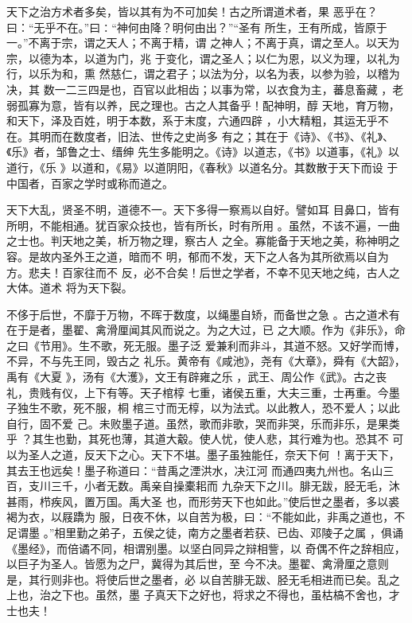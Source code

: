 \documentclass[a4paper,12pt,UTF8,twoside]{ctexbook}
\begin{document}
天下之治方术者多矣，皆以其有为不可加矣！古之所谓道术者，果 恶乎在？曰：“无乎不在。”曰∶“神何由降？明何由出？”“圣有 所生，王有所成，皆原于一。”不离于宗，谓之天人；不离于精，谓 之神人；不离于真，谓之至人。以天为宗，以德为本，以道为门，兆 于变化，谓之圣人；以仁为恩，以义为理，以礼为行，以乐为和，熏 然慈仁，谓之君子；以法为分，以名为表，以参为验，以稽为决，其 数一二三四是也，百官以此相齿；以事为常，以衣食为主，蕃息畜藏 ，老弱孤寡为意，皆有以养，民之理也。古之人其备乎！配神明，醇 天地，育万物，和天下，泽及百姓，明于本数，系于末度，六通四辟 ，小大精粗，其运无乎不在。其明而在数度者，旧法、世传之史尚多 有之；其在于《诗》、《书》、《礼》、《乐》者，邹鲁之士、缙绅 先生多能明之。《诗》以道志，《书》以道事，《礼》以道行，《乐 》以道和，《易》以道阴阳，《春秋》以道名分。其数散于天下而设 于中国者，百家之学时或称而道之。

天下大乱，贤圣不明，道德不一。天下多得一察焉以自好。譬如耳 目鼻口，皆有所明，不能相通。犹百家众技也，皆有所长，时有所用 。虽然，不该不遍，一曲之士也。判天地之美，析万物之理，察古人 之全。寡能备于天地之美，称神明之容。是故内圣外王之道，暗而不 明，郁而不发，天下之人各为其所欲焉以自为方。悲夫！百家往而不 反，必不合矣！后世之学者，不幸不见天地之纯，古人之大体。道术 将为天下裂。

不侈于后世，不靡于万物，不晖于数度，以绳墨自矫，而备世之急 。古之道术有在于是者，墨翟、禽滑厘闻其风而说之。为之大过，已 之大顺。作为《非乐》，命之曰《节用》。生不歌，死无服。墨子泛 爱兼利而非斗，其道不怒。又好学而博，不异，不与先王同，毁古之 礼乐。黄帝有《咸池》，尧有《大章》，舜有《大韶》，禹有《大夏 》，汤有《大濩》，文王有辟雍之乐 ，武王、周公作《武》。古之丧礼，贵贱有仪，上下有等。天子棺椁 七重，诸侯五重，大夫三重，士再重。今墨子独生不歌，死不服，桐 棺三寸而无椁，以为法式。以此教人，恐不爱人；以此自行，固不爱 己。未败墨子道。虽然，歌而非歌，哭而非哭，乐而非乐，是果类乎 ？其生也勤，其死也薄，其道大觳。使人忧，使人悲，其行难为也。恐其不 可以为圣人之道，反天下之心。天下不堪。墨子虽独能任，奈天下何 ！离于天下，其去王也远矣！墨子称道曰：“昔禹之湮洪水，决江河 而通四夷九州也。名山三百，支川三千，小者无数。禹亲自操橐耜而 九杂天下之川。腓无跋，胫无毛，沐甚雨，栉疾风，置万国。禹大圣 也，而形劳天下也如此。”使后世之墨者，多以裘褐为衣，以屐蹻为 服，日夜不休，以自苦为极，曰：“不能如此，非禹之道也，不足谓墨 。”相里勤之弟子，五侯之徒，南方之墨者若获、已齿、邓陵子之属 ，俱诵《墨经》，而倍谲不同，相谓别墨。以坚白同异之辩相訾，以 奇偶不仵之辞相应，以巨子为圣人。皆愿为之尸，冀得为其后世，至 今不决。墨翟、禽滑厘之意则是，其行则非也。将使后世之墨者，必 以自苦腓无跋、胫无毛相进而已矣。乱之上也，治之下也。虽然，墨 子真天下之好也，将求之不得也，虽枯槁不舍也，才士也夫！
\end{document}
